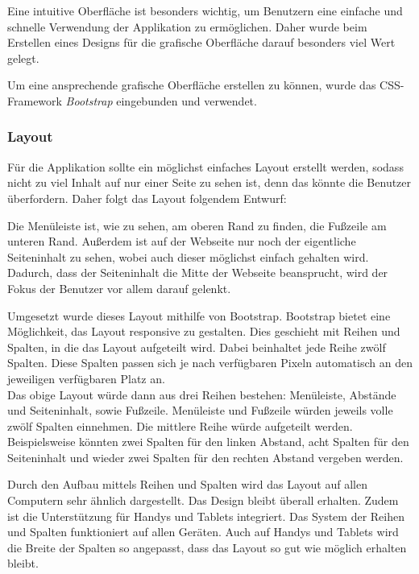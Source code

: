 
Eine intuitive Oberfläche ist besonders wichtig, um Benutzern eine einfache und schnelle Verwendung der Applikation zu ermöglichen. Daher wurde beim Erstellen eines Designs für die grafische Oberfläche darauf besonders viel Wert gelegt.

Um eine ansprechende grafische Oberfläche erstellen zu können, wurde das CSS-Framework \textit{Bootstrap} eingebunden und verwendet.

\subsubsection{Layout}
Für die Applikation sollte ein möglichst einfaches Layout erstellt werden, sodass nicht zu viel Inhalt auf nur einer Seite zu sehen ist, denn das könnte die Benutzer überfordern. Daher folgt das Layout folgendem Entwurf:


Die Menüleiste ist, wie zu sehen, am oberen Rand zu finden, die Fußzeile am unteren Rand. Außerdem ist auf der Webseite nur noch der eigentliche Seiteninhalt zu sehen, wobei auch dieser möglichst einfach gehalten wird. Dadurch, dass der Seiteninhalt die Mitte der Webseite beansprucht, wird der Fokus der Benutzer vor allem darauf gelenkt.

\newpage

Umgesetzt wurde dieses Layout mithilfe von Bootstrap. Bootstrap bietet eine Möglichkeit, das Layout responsive zu gestalten. Dies geschieht mit Reihen und Spalten, in die das Layout aufgeteilt wird. Dabei beinhaltet jede Reihe zwölf Spalten. Diese Spalten passen sich je nach verfügbaren Pixeln automatisch an den jeweiligen verfügbaren Platz an.\\
Das obige Layout würde dann aus drei Reihen bestehen: Menüleiste, Abstände und Seiteninhalt, sowie Fußzeile. Menüleiste und Fußzeile würden jeweils volle zwölf Spalten einnehmen. Die mittlere Reihe würde aufgeteilt werden. Beispielsweise könnten zwei Spalten für den linken Abstand, acht Spalten für den Seiteninhalt und wieder zwei Spalten für den rechten Abstand vergeben werden.

Durch den Aufbau mittels Reihen und Spalten wird das Layout auf allen Computern sehr ähnlich dargestellt. Das Design bleibt überall erhalten. Zudem ist die Unterstützung für Handys und Tablets integriert. Das System der Reihen und Spalten funktioniert auf allen Geräten. Auch auf Handys und Tablets wird die Breite der Spalten so angepasst, dass das Layout so gut wie möglich erhalten bleibt.

